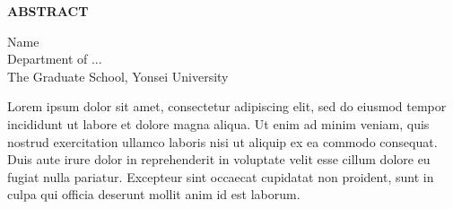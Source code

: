 \clearpage
\begin{centering}
\textbf{ABSTRACT}\\
\vspace{\baselineskip}
\end{centering}

\begin{flushright}
    Name  \\
    Department of ... \\
    The Graduate School, Yonsei University
\end{flushright}

Lorem ipsum dolor sit amet, consectetur adipiscing elit, sed do eiusmod tempor incididunt ut labore et dolore magna aliqua. Ut enim ad minim veniam, quis nostrud exercitation ullamco laboris nisi ut aliquip ex ea commodo consequat. Duis aute irure dolor in reprehenderit in voluptate velit esse cillum dolore eu fugiat nulla pariatur. Excepteur sint occaecat cupidatat non proident, sunt in culpa qui officia deserunt mollit anim id est laborum.


